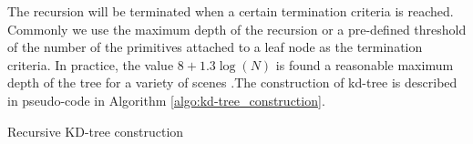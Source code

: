 The recursion will be terminated when a certain termination criteria is reached. Commonly we use the maximum depth of the recursion or a pre-defined threshold of the number of the primitives attached to a leaf node as the termination criteria. In practice, the value \(8 + 1.3\log(N)\) is found a reasonable maximum depth of the tree for a variety of scenes \cite{ph2004}.The construction of kd-tree is described in pseudo-code in Algorithm \ref{algo:kd-tree_construction}.


\SetAlFnt{\small}
\begin{algorithm}[H]



	
	\myfunc \BuildRec{\triangleList, \voxel} \newline 

	\myalgblankline
	
	\myfunc \KDTreeBuildRec{\triangleList} \newline
	\Begin {
		\voxel = \CalcBounds{\triangleList}\;
		\Return \BuildRec{\triangleList, \voxel}\;
	}

	\caption{Recursive KD-tree construction}
	\label{algo:kd-tree_construction}
\end{algorithm}


